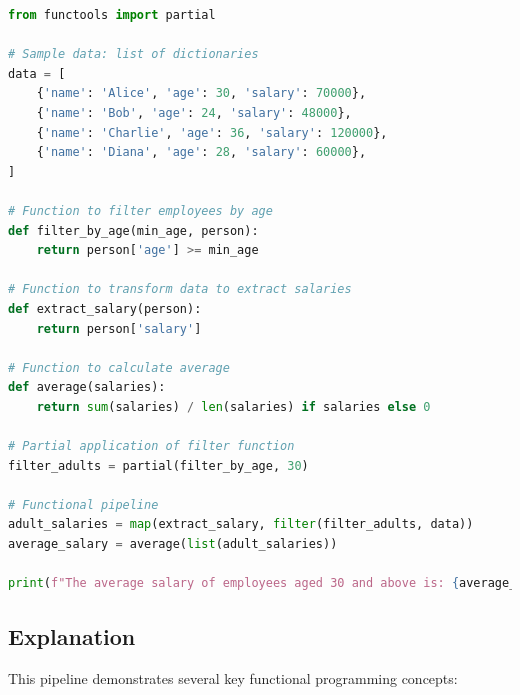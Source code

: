 \documentclass[a4paper]{article}
\begin{document}
\begin{lstlisting}[language=Python, caption=Functional Data Processing Pipeline]
from functools import partial

# Sample data: list of dictionaries
data = [
    {'name': 'Alice', 'age': 30, 'salary': 70000},
    {'name': 'Bob', 'age': 24, 'salary': 48000},
    {'name': 'Charlie', 'age': 36, 'salary': 120000},
    {'name': 'Diana', 'age': 28, 'salary': 60000},
]

# Function to filter employees by age
def filter_by_age(min_age, person):
    return person['age'] >= min_age

# Function to transform data to extract salaries
def extract_salary(person):
    return person['salary']

# Function to calculate average
def average(salaries):
    return sum(salaries) / len(salaries) if salaries else 0

# Partial application of filter function
filter_adults = partial(filter_by_age, 30)

# Functional pipeline
adult_salaries = map(extract_salary, filter(filter_adults, data))
average_salary = average(list(adult_salaries))

print(f"The average salary of employees aged 30 and above is: {average_salary}")
\end{lstlisting}

\subsection{Explanation}
This pipeline demonstrates several key functional programming concepts:
\end{document}
